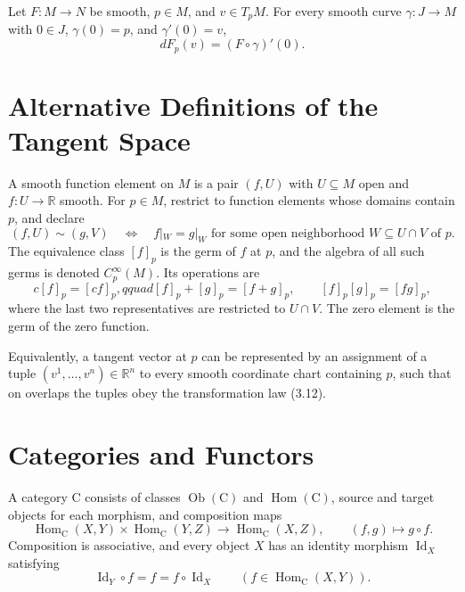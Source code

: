 \begin{corollary}
\label{cor:3-25}





Let $F:M\to N$ be smooth, $p\in M$, and $v\in T_pM$. For every smooth curve
$\gamma:J\to M$ with $0\in J$, $\gamma(0)=p$, and $\gamma'(0)=v$,
\[
dF_p(v)=(F\circ\gamma)'(0).
\]
\end{corollary}


\section{Alternative Definitions of the Tangent Space}

\begin{definition}
\label{def:3-18-extra-1}



A smooth function element on $M$ is a pair $(f,U)$ with $U\subseteq M$ open
and $f:U\to\mathbb{R}$ smooth. For $p\in M$, restrict to function elements
whose domains contain $p$, and declare
\[
(f,U)\sim(g,V)
\quad\Longleftrightarrow\quad
f|_W=g|_W\text{ for some open neighborhood }W\subseteq U\cap V\text{ of }p.
\]
The equivalence class $[f]_p$ is the germ of $f$ at $p$, and the algebra of
all such germs is denoted $C_p^\infty(M)$. Its operations are
\[
c[f]_p=[cf]_p,qquad [f]_p+[g]_p=[f+g]_p,
\qquad [f]_p[g]_p=[fg]_p,
\]
where the last two representatives are restricted to $U\cap V$. The zero
element is the germ of the zero function.
\end{definition}

\begin{definition}
\label{def:3-18-extra-4}




Equivalently, a tangent vector at $p$ can be represented by an assignment of a
tuple $(v^1,\ldots,v^n)\in\mathbb{R}^n$ to every smooth coordinate chart
containing $p$, such that on overlaps the tuples obey the transformation law
(3.12).
\end{definition}


\section{Categories and Functors}

\begin{definition}
\label{def:3-19-extra-1}



A category $\mathrm C$ consists of classes $\operatorname{Ob}(\mathrm C)$ and
$\operatorname{Hom}(\mathrm C)$, source and target objects for each morphism,
and composition maps
\[
\operatorname{Hom}_{\mathrm C}(X,Y)\times
\operatorname{Hom}_{\mathrm C}(Y,Z)
\longrightarrow\operatorname{Hom}_{\mathrm C}(X,Z),
\qquad (f,g)\longmapsto g\circ f.
\]
Composition is associative, and every object $X$ has an identity morphism
$\operatorname{Id}_X$ satisfying
\[
\operatorname{Id}_Y\circ f=f=f\circ\operatorname{Id}_X
\qquad(f\in\operatorname{Hom}_{\mathrm C}(X,Y)).
\]
\end{definition}

